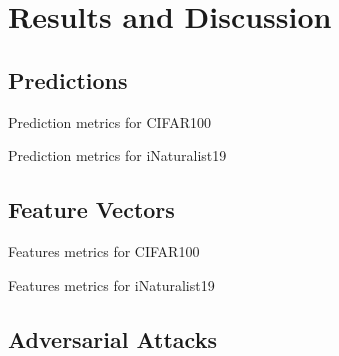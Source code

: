 \chapter{Results and Discussion}
\label{ch:results-and-discussion}



\section{Predictions}
\label{sec:predictions-results-and-discussion}

\begin{table}
  \renewcommand{\arraystretch}{1.2}%
  \centering
  \footnotesize
  
  \normalsize
  \caption{Prediction metrics for CIFAR100}
  \label{tab:CIFAR100-predictions-metrics}
\end{table}

\begin{table}
  \renewcommand{\arraystretch}{1.2}%
  \centering
  \footnotesize
  
  \normalsize
  \caption{Prediction metrics for iNaturalist19}
  \label{tab:iNaturalist19-predictions-metrics}
\end{table}


\section{Feature Vectors}
\label{sec:feature-vectors-results-and-discussion}

\begin{table}
  \renewcommand{\arraystretch}{1.2}%
  \centering
  \footnotesize
  
  \normalsize
  \caption{Features metrics for CIFAR100}
  \label{tab:CIFAR100-features-metrics}
\end{table}


\begin{table}
  \renewcommand{\arraystretch}{1.2}%
  \centering
  \footnotesize
  
  \normalsize
  \caption{Features metrics for iNaturalist19}
  \label{tab:iNaturalist19-features-metrics}
\end{table}

\section{Adversarial Attacks}
\label{sec:adversarial-attacks-results-and-discussion}
